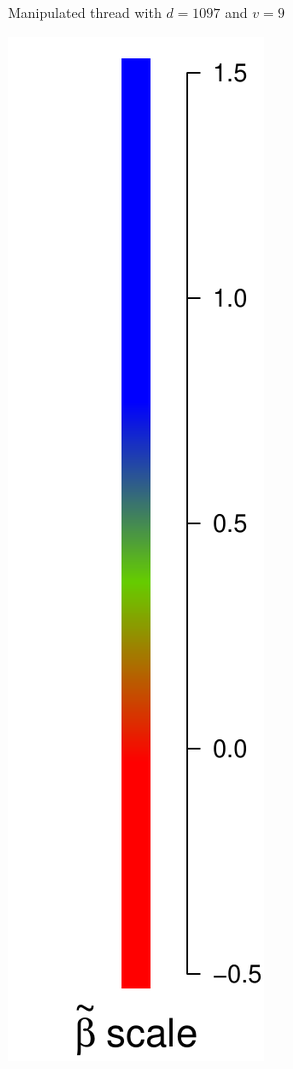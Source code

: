 \documentclass[9pt,twocolumn,twoside,lineno]{pnas-new}
\begin{document}
\begin{figure}[!ht]
\begin{subfigure}[t]{.44\linewidth}
		\caption{\footnotesize Manipulated thread with $d=1097$ and $v=9$}
		\label{fig: m d=1097, v=9}
	\end{subfigure}
	\begin{subfigure}[t]{.1\linewidth}
		\centering
		\includegraphics[width=1\linewidth]{betascale.pdf}

\end{subfigure}
\end{figure}
\end{document}
